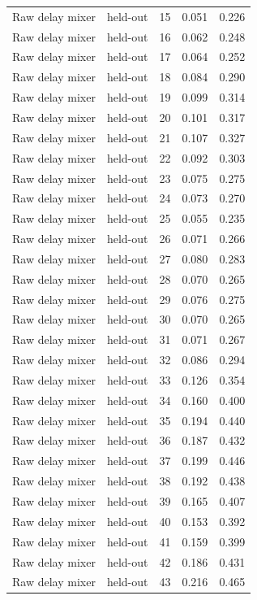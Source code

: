 \begin{tabular}{llrrr}
Raw delay mixer & held-out & 15 & 0.051 & 0.226 \\
Raw delay mixer & held-out & 16 & 0.062 & 0.248 \\
Raw delay mixer & held-out & 17 & 0.064 & 0.252 \\
Raw delay mixer & held-out & 18 & 0.084 & 0.290 \\
Raw delay mixer & held-out & 19 & 0.099 & 0.314 \\
Raw delay mixer & held-out & 20 & 0.101 & 0.317 \\
Raw delay mixer & held-out & 21 & 0.107 & 0.327 \\
Raw delay mixer & held-out & 22 & 0.092 & 0.303 \\
Raw delay mixer & held-out & 23 & 0.075 & 0.275 \\
Raw delay mixer & held-out & 24 & 0.073 & 0.270 \\
Raw delay mixer & held-out & 25 & 0.055 & 0.235 \\
Raw delay mixer & held-out & 26 & 0.071 & 0.266 \\
Raw delay mixer & held-out & 27 & 0.080 & 0.283 \\
Raw delay mixer & held-out & 28 & 0.070 & 0.265 \\
Raw delay mixer & held-out & 29 & 0.076 & 0.275 \\
Raw delay mixer & held-out & 30 & 0.070 & 0.265 \\
Raw delay mixer & held-out & 31 & 0.071 & 0.267 \\
Raw delay mixer & held-out & 32 & 0.086 & 0.294 \\
Raw delay mixer & held-out & 33 & 0.126 & 0.354 \\
Raw delay mixer & held-out & 34 & 0.160 & 0.400 \\
Raw delay mixer & held-out & 35 & 0.194 & 0.440 \\
Raw delay mixer & held-out & 36 & 0.187 & 0.432 \\
Raw delay mixer & held-out & 37 & 0.199 & 0.446 \\
Raw delay mixer & held-out & 38 & 0.192 & 0.438 \\
Raw delay mixer & held-out & 39 & 0.165 & 0.407 \\
Raw delay mixer & held-out & 40 & 0.153 & 0.392 \\
Raw delay mixer & held-out & 41 & 0.159 & 0.399 \\
Raw delay mixer & held-out & 42 & 0.186 & 0.431 \\
Raw delay mixer & held-out & 43 & 0.216 & 0.465 \\

\end{tabular}
